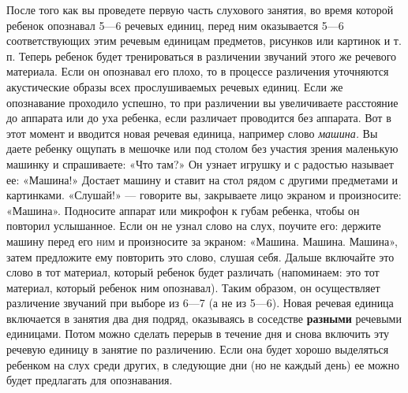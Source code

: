 \documentclass{book}
\renewcommand{\emph}[1]{\textit{#1}}
\begin{document}
После того как вы проведете первую часть слухового занятия, во время
которой ребенок опознавал 5---6 речевых единиц, перед ним оказывается
5---6 соответствующих этим речевым единицам предметов, рисунков или
картинок и т. п. Теперь ребенок будет тренироваться в различении
звучаний этого же речевого материала. Если он опознавал его плохо, то в
процессе различения уточняются акустические образы всех прослушиваемых
речевых единиц. Если же опознавание проходило успешно, то при различении
вы увеличиваете расстояние до аппарата или до уха ребенка, если
различает проводится без аппарата. Вот в этот момент и вводится новая
речевая единица, например слово \emph{машина.} Вы даете ребенку ощупать
в мешочке или под столом без участия зрения маленькую машинку и
спрашиваете: «Что там?» Он узнает игрушку и с радостью называет ее:
«Машина!» Достает машину и ставит на стол рядом с другими предметами и
картинками. «Слушай!» --- говорите вы, закрываете лицо экраном и
произносите: «Машина». Подносите аппарат или микрофон к губам ребенка,
чтобы он повторил услышанное. Если он не узнал слово на слух, поучите
его: держите машину перед его \textsc{ним} и произносите за экраном:
«Машина. Машина. Машина», затем предложите ему повторить это слово,
слушая себя. Дальше включайте это слово в тот материал, который ребенок
будет различать (напоминаем: это тот материал, который ребенок ним
опознавал). Таким образом, он осуществляет различение звучаний при
выборе из 6---7 (а не из 5---6). Новая речевая единица включается в
занятия два дня подряд, оказываясь в соседстве \textbf{разными} речевыми
единицами. Потом можно сделать перерыв в течение дня и снова включить
эту речевую единицу в занятие по различению. Если она будет хорошо
выделяться ребенком на слух среди других, в следующие дни (но не каждый
день) ее можно будет предлагать для опознавания.
\end{document}
